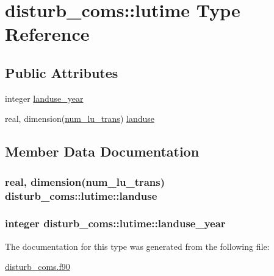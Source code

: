 \hypertarget{structdisturb__coms_1_1lutime}{}\section{disturb\+\_\+coms\+:\+:lutime Type Reference}
\label{structdisturb__coms_1_1lutime}
\subsection*{Public Attributes}
\begin{DoxyCompactItemize}
\item 
integer \hyperlink{structdisturb__coms_1_1lutime_afba2fbf3ca04baa3beedb424ebb51022}{landuse\+\_\+year}
\item 
real, dimension(\hyperlink{namespacedisturb__coms_ac39535da2e75c569a86d8f91379d75d9}{num\+\_\+lu\+\_\+trans}) \hyperlink{structdisturb__coms_1_1lutime_a807d824fe2cb6854099a8f49246617c7}{landuse}
\end{DoxyCompactItemize}


\subsection{Member Data Documentation}
\hypertarget{structdisturb__coms_1_1lutime_a807d824fe2cb6854099a8f49246617c7}{}
\subsubsection[{landuse}]{\setlength{\rightskip}{0pt plus 5cm}real, dimension({\bf num\+\_\+lu\+\_\+trans}) disturb\+\_\+coms\+::lutime\+::landuse}\label{structdisturb__coms_1_1lutime_a807d824fe2cb6854099a8f49246617c7}
\hypertarget{structdisturb__coms_1_1lutime_afba2fbf3ca04baa3beedb424ebb51022}{}
\subsubsection[{landuse\+\_\+year}]{\setlength{\rightskip}{0pt plus 5cm}integer disturb\+\_\+coms\+::lutime\+::landuse\+\_\+year}\label{structdisturb__coms_1_1lutime_afba2fbf3ca04baa3beedb424ebb51022}


The documentation for this type was generated from the following file\+:\begin{DoxyCompactItemize}
\item 
\hyperlink{disturb__coms_8f90}{disturb\+\_\+coms.\+f90}\end{DoxyCompactItemize}
